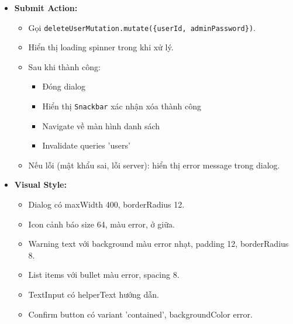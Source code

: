 \begin{itemize}
\begin{itemize}
            \item Mật khẩu admin không được rỗng.
            \item Text xác nhận phải chính xác là ``XÓA TÀI KHOẢN'' (case-sensitive).
            \item Nút xác nhận chỉ enable khi cả hai điều kiện đều thỏa mãn.
        \end{itemize}
    \item \textbf{Submit Action:}
        \begin{itemize}
            \item Gọi \texttt{deleteUserMutation.mutate(\{userId, adminPassword\})}.
            \item Hiển thị loading spinner trong khi xử lý.
            \item Sau khi thành công: 
                \begin{itemize}
                    \item Đóng dialog
                    \item Hiển thị \texttt{Snackbar} xác nhận xóa thành công
                    \item Navigate về màn hình danh sách
                    \item Invalidate queries 'users'
                \end{itemize}
            \item Nếu lỗi (mật khẩu sai, lỗi server): hiển thị error message trong dialog.
        \end{itemize}
    \item \textbf{Visual Style:}
        \begin{itemize}
            \item Dialog có maxWidth 400, borderRadius 12.
            \item Icon cảnh báo size 64, màu error, ở giữa.
            \item Warning text với background màu error nhạt, padding 12, borderRadius 8.
            \item List items với bullet màu error, spacing 8.
            \item TextInput có helperText hướng dẫn.
            \item Confirm button có variant 'contained', backgroundColor error.
        \end{itemize}
\end{itemize}


